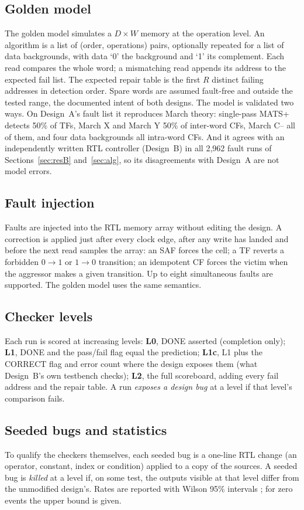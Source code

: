 \documentclass[conference]{IEEEtran}
\begin{document}
\subsection{Golden model}
The golden model simulates a $D\times W$ memory at the operation level. An algorithm is a list of
(order, operations) pairs, optionally repeated for a list of data backgrounds, with data `0' the
background and `1' its complement. Each read compares the whole word; a mismatching read appends
its address to the expected fail list. The expected repair table is the first $R$ distinct failing
addresses in detection order. Spare words are assumed fault-free and outside the tested range,
the documented intent of both designs. The model is validated two ways. On Design~A's fault list
it reproduces March theory: single-pass MATS+ detects 50\% of TFs, March X and March Y 50\% of
inter-word CFs, March C-- all of them, and four data backgrounds all intra-word CFs. And it agrees
with an independently written RTL controller (Design~B) in all 2{,}962 fault runs of
Sections~\ref{sec:resB} and~\ref{sec:alg}, so its disagreements with Design~A are not model errors.

\subsection{Fault injection}
Faults are injected into the RTL memory array without editing the design. A correction is applied
just after every clock edge, after any write has landed and before the next read samples the
array: an SAF forces the cell; a TF reverts a forbidden $0\!\to\!1$ or $1\!\to\!0$ transition; an
idempotent CF forces the victim when the aggressor makes a given transition. Up to eight
simultaneous faults are supported. The golden model uses the same semantics.

\subsection{Checker levels}
Each run is scored at increasing levels: \textbf{L0}, DONE asserted (completion only);
\textbf{L1}, DONE and the pass/fail flag equal the prediction; \textbf{L1c}, L1 plus the CORRECT
flag and error count where the design exposes them (what Design~B's own testbench checks);
\textbf{L2}, the full scoreboard, adding every fail address and the repair table. A run
\emph{exposes a design bug} at a level if that level's comparison fails.

\subsection{Seeded bugs and statistics}
To qualify the checkers themselves, each seeded bug is a one-line RTL change (an operator,
constant, index or condition) applied to a copy of the sources. A seeded bug is \emph{killed} at
a level if, on some test, the outputs visible at that level differ from the unmodified design's.
Rates are reported with Wilson 95\% intervals \cite{wilson1927}; for zero events the upper bound
is given.
\end{document}
